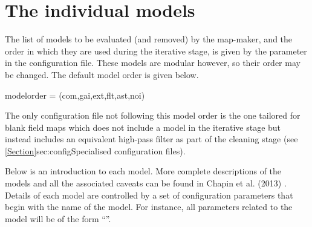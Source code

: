 \section{The individual models}
\label{sec:models}

The list of models to be evaluated (and removed) by the map-maker, and
the order in which they are used during the iterative stage, is given by
the  parameter in the configuration file.
These models are modular however, so their order may be changed. The
default model order is given below.

\begin{terminalv}
modelorder = (com,gai,ext,flt,ast,noi)
\end{terminalv}

The only configuration file not following this model order is the one tailored
for blank field maps which does not include a  model in the
iterative stage but instead includes an equivalent high-pass filter
as part of the cleaning stage (see \cref{Section}{sec:config}{Specialised
configuration files}).

Below is an introduction to each model. More complete descriptions of the
models and all the associated caveats can be found in Chapin et al.
(2013) \cite{mapmaker}. Details of each model are controlled by a set of
configuration parameters that begin with the name of the model. For
instance, all parameters related to the  model will be of the
form ``''.

